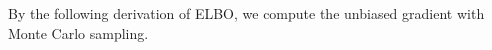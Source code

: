 By the following derivation of ELBO, we compute the unbiased gradient with Monte Carlo sampling. \\
